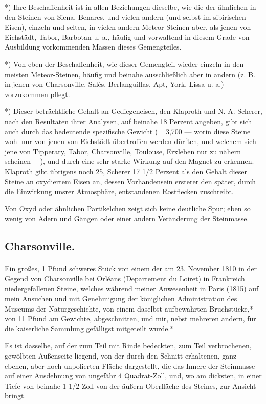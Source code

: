 \documentclass[a4paper, 11pt, oneside, german]{article}
\begin{document}
*) Ihre Beschaffenheit ist in allen Beziehungen dieselbe, wie die der ähnlichen in den Steinen von Siena, Benares, und vielen andern (und selbst im sibirischen Eisen), einzeln und selten, in vielen andern Meteor-Steinen aber, als jenen von Eichstädt, Tabor, Barbotan u. a., häufig und vorwaltend in diesem Grade von Ausbildung vorkommenden Massen dieses Gemengteiles.

*) Von eben der Beschaffenheit, wie dieser Gemengteil wieder einzeln in den meisten Meteor-Steinen, häufig und beinahe ausschließlich aber in andern (z. B. in jenen von Charsonville, Salés, Berlanguillas, Apt, York, Lissa u. a.) vorzukommen pflegt.

*) Dieser beträchtliche Gehalt an Gediegeneisen, den Klaproth und N. A. Scherer, nach den Resultaten ihrer Analysen, auf beinahe 18 Perzent angeben, gibt sich auch durch das bedeutende spezifische Gewicht (= 3,700 --- worin diese Steine wohl nur von jenen von Eichstädt übertroffen werden dürften, und welchem sich jene von Tipperary, Tabor, Charsonville, Toulouse, Erxleben nur zu nähern scheinen ---), und durch eine sehr starke Wirkung auf den Magnet zu erkennen. Klaproth gibt übrigens noch 25, Scherer 17 1/2 Perzent als den Gehalt dieser Steine an oxydiertem Eisen an, dessen Vorhandensein ersterer den später, durch die Einwirkung unsrer Atmosphäre, entstandenen Rostflecken zuschreibt.

Von Oxyd oder ähnlichen Partikelchen zeigt sich keine deutliche Spur; eben so wenig von Adern und Gängen oder einer andern Veränderung der Steinmasse.

\subsection{Charsonville.}
\paragraph{}
Ein großes, 1 Pfund schweres Stück von einem der am 23. November 1810 in der Gegend von Charsonville bei Orléans (Departement du Loiret) in Frankreich niedergefallenen Steine, welches während meiner Anwesenheit in Paris (1815) auf mein Ansuchen und mit Genehmigung der königlichen Administration des Museums der Naturgeschichte, von einem daselbst aufbewahrten Bruchstücke,* von 11 Pfund am Gewichte, abgeschnitten, und mir, nebst mehreren andern, für die kaiserliche Sammlung gefälligst mitgeteilt wurde.*

Es ist dasselbe, auf der zum Teil mit Rinde bedeckten, zum Teil verbrochenen, gewölbten Außenseite liegend, von der durch den Schnitt erhaltenen, ganz ebenen, aber noch unpolierten Fläche dargestellt, die das Innere der Steinmasse auf einer Ausdehnung von ungefähr 4 Quadrat-Zoll, und, wo am dicksten, in einer Tiefe von beinahe 1 1/2 Zoll von der äußern Oberfläche des Steines, zur Ansicht bringt.
\end{document}
